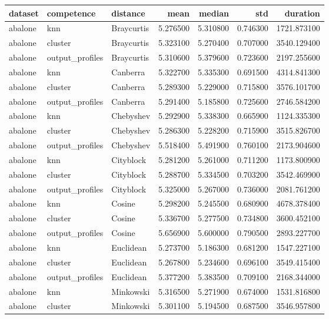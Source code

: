 \begin{tabular}{lllrrrr}
\toprule
dataset & competence & distance & mean & median & std & duration \\
\midrule
abalone & knn & Braycurtis & 5.276500 & 5.310800 & 0.746300 & 1721.873100 \\
abalone & cluster & Braycurtis & 5.323100 & 5.270400 & 0.707000 & 3540.129400 \\
abalone & output\_profiles & Braycurtis & 5.310600 & 5.379600 & 0.723600 & 2197.255600 \\
abalone & knn & Canberra & 5.322700 & 5.335300 & 0.691500 & 4314.841300 \\
abalone & cluster & Canberra & 5.289300 & 5.229000 & 0.715800 & 3576.101700 \\
abalone & output\_profiles & Canberra & 5.291400 & 5.185800 & 0.725600 & 2746.584200 \\
abalone & knn & Chebyshev & 5.292900 & 5.338300 & 0.665900 & 1124.335300 \\
abalone & cluster & Chebyshev & 5.286300 & 5.228200 & 0.715900 & 3515.826700 \\
abalone & output\_profiles & Chebyshev & 5.518400 & 5.491900 & 0.760100 & 2173.904600 \\
abalone & knn & Cityblock & 5.281200 & 5.261000 & 0.711200 & 1173.800900 \\
abalone & cluster & Cityblock & 5.288700 & 5.334500 & 0.703200 & 3542.469900 \\
abalone & output\_profiles & Cityblock & 5.325000 & 5.267000 & 0.736000 & 2081.761200 \\
abalone & knn & Cosine & 5.298200 & 5.245500 & 0.680900 & 4678.378400 \\
abalone & cluster & Cosine & 5.336700 & 5.277500 & 0.734800 & 3600.452100 \\
abalone & output\_profiles & Cosine & 5.656900 & 5.600000 & 0.790500 & 2893.227700 \\
abalone & knn & Euclidean & 5.273700 & 5.186300 & 0.681200 & 1547.227100 \\
abalone & cluster & Euclidean & 5.267800 & 5.234600 & 0.696100 & 3549.415400 \\
abalone & output\_profiles & Euclidean & 5.377200 & 5.383500 & 0.709100 & 2168.344000 \\
abalone & knn & Minkowski & 5.316500 & 5.271900 & 0.674000 & 1531.816800 \\
abalone & cluster & Minkowski & 5.301100 & 5.194500 & 0.687500 & 3546.957800 \\

\end{tabular}
